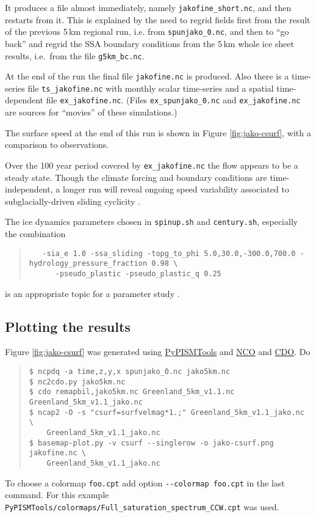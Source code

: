 It produces a file almost immediately, namely \verb|jakofine_short.nc|, and then restarts from it.  This is explained by the need to regrid fields first from the result of the previous 5\,km regional run, i.e. from \verb|spunjako_0.nc|, and then to ``go back'' and regrid the SSA boundary conditions from the 5\,km whole ice sheet results, i.e.~from the file \verb|g5km_bc.nc|.

At the end of the run the final file \verb|jakofine.nc| is produced.  Also there is a time-series file \verb|ts_jakofine.nc| with monthly scalar time-series and a spatial time-dependent file \verb|ex_jakofine.nc|.  (Files \verb|ex_spunjako_0.nc| and \verb|ex_jakofine.nc| are sources for ``movies'' of these simulations.)

The surface speed at the end of this run is shown in Figure \ref{fig:jako-csurf}, with a comparison to observations.

Over the 100 year period covered by \verb|ex_jakofine.nc| the flow appears to be a steady state.  Though the climate forcing and boundary conditions are time-independent, a longer run will reveal ongoing speed variability associated to subglacially-driven sliding cyclicity \cite{vanPeltOerlemans2012}.

The ice dynamics parameters chosen in \verb|spinup.sh| and \verb|century.sh|, especially the combination
\begin{quote}\small
\begin{verbatim}
   -sia_e 1.0 -ssa_sliding -topg_to_phi 5.0,30.0,-300.0,700.0 -hydrology_pressure_fraction 0.98 \
      -pseudo_plastic -pseudo_plastic_q 0.25
\end{verbatim}
\normalsize\end{quote}
is an appropriate topic for a parameter study \cite{BKAJS}.


\subsection*{Plotting the results}

Figure \ref{fig:jako-csurf} was generated using \href{https://github.com/pism/PyPISMTools}{PyPISMTools} and \href{http://nco.sourceforge.net/}{NCO} and \href{http://code.zmaw.de/projects/cdo}{CDO}.  Do
\begin{quote}\small
\begin{verbatim}
$ ncpdq -a time,z,y,x spunjako_0.nc jako5km.nc
$ nc2cdo.py jako5km.nc
$ cdo remapbil,jako5km.nc Greenland_5km_v1.1.nc Greenland_5km_v1.1_jako.nc
$ ncap2 -O -s "csurf=surfvelmag*1.;" Greenland_5km_v1.1_jako.nc \
    Greenland_5km_v1.1_jako.nc
$ basemap-plot.py -v csurf --singlerow -o jako-csurf.png jakofine.nc \
    Greenland_5km_v1.1_jako.nc
\end{verbatim}
\normalsize\end{quote}
To choose a colormap \verb|foo.cpt| add option \verb|--colormap foo.cpt| in the last command. For this example \verb|PyPISMTools/colormaps/Full_saturation_spectrum_CCW.cpt| was used.


